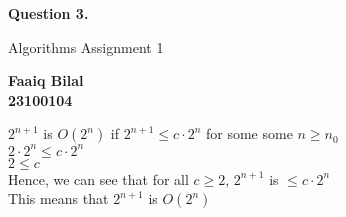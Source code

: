 \documentclass[]{article}
\begin{document}
\begin{center}
    \vspace*{1cm}

    \textbf{Question 3.}

    \vspace{0.5cm}
     Algorithms Assignment 1

    \vspace{0.15cm}

    \textbf{Faaiq Bilal} \\ 
    \textbf{23100104}
         
\end{center}


$ 2^{n+1} $ is $O(2^n)$ if $2^{n+1} \leq  c \cdot{2^n} $ for some some $ n \geq n_0 $ \\ 
$ 2 \cdot{2^{n}} \leq c \cdot{2^n} $ \\
$ 2 \leq c $ \\
Hence, we can see that for all $ c \geq 2$,  $ 2^{n+1} $ is $\leq  c \cdot{2^n} $ \\
This means that $ 2^{n+1} $ is $O(2^n)$

 
\end{document}
